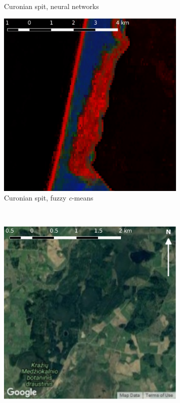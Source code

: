 \documentclass[a4paper,12pt]{scrbook}
\begin{document}
\begin{figure}
\begin{subfigure}[t]{.24\textwidth}
    \caption{Curonian spit, neural networks}
    \label{subfig-kursiunerija-nn}
  \end{subfigure} \hfill
  \begin{subfigure}[t]{.24\textwidth}
    \includegraphics[width=\textwidth]{thesis-figures/figures-qgis/kursiunerija-cm}
    \caption{Curonian spit, fuzzy \textit{c}-means}
    \label{subfig-kursiunerija-cm}
  \end{subfigure} \
  \begin{subfigure}[t]{.24\textwidth}
    \includegraphics[width=\textwidth]{thesis-figures/figures-qgis/medziokalnis-google}

\end{subfigure}
\end{figure}
\end{document}
